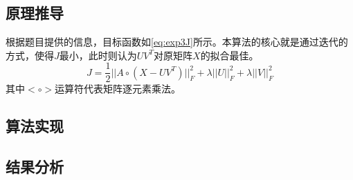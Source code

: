 \documentclass[a4paper,12pt]{article}
\begin{document}
    \subsection{原理推导}
    根据题目提供的信息，目标函数如\cref{eq:exp3J}所示。本算法的核心就是通过迭代的方式，使得$J$最小，此时则认为$UV^T$对原矩阵$X$的拟合最佳。
    \begin{equation}
      \label{eq:exp3J}
      J =\frac{1}{2} ||A\circ (X-UV^T)||_F^2 + \lambda ||U||_F^2 + \lambda ||V||_F^2
    \end{equation}
    其中$<\circ>$运算符代表矩阵逐元素乘法。
    \subsection{算法实现}

    \subsection{结果分析}

    \label{applastpage}
    \newpage
    
    
\iffalse
\begin{itemize}[noitemsep,topsep=0pt]
\end{itemize}
\begin{enumerate}[label=\Roman{*}.,noitemsep,topsep=0pt]
\end{enumerate}
\begin{multicols}{2}
\end{multicols}
\fi
\end{document}
